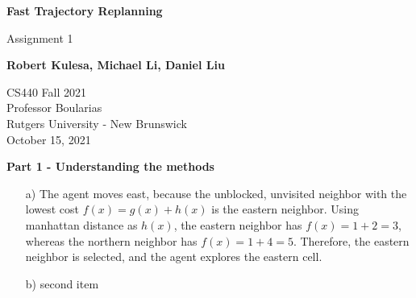 \documentclass[11pt]{article}
\begin{document}
    \begin{titlepage}
        \begin{center}
            \vspace*{1cm}

            \Huge
            \textbf{Fast Trajectory Replanning}

            \vspace{0.5cm}
            \LARGE
            Assignment 1

            \vspace{1cm}

            \textbf{Robert Kulesa, Michael Li, Daniel Liu}

            \vfill


            \vspace{0.8cm}

            \Large
            CS440 Fall 2021\\
            Professor Boularias\\
            Rutgers University - New Brunswick\\
            October 15, 2021

        \end{center}
    \end{titlepage}
    \begin{center}
        \Large
        \textbf{Part 1 - Understanding the methods}
    \end{center}
    \normalsize
    \begin{enumerate}
        \item[a)] The agent moves east, because the unblocked,
        unvisited neighbor with the lowest cost $f(x) = g(x) + h(x)$ is the eastern neighbor.
        Using manhattan distance as $h(x)$, the eastern neighbor has $f(x) = 1 + 2 = 3$,
        whereas the northern neighbor has $f(x) = 1 + 4 = 5$.
        Therefore, the eastern neighbor is selected, and the agent explores the eastern cell.
        \item[b)] second item
    \end{enumerate}
\end{document}
